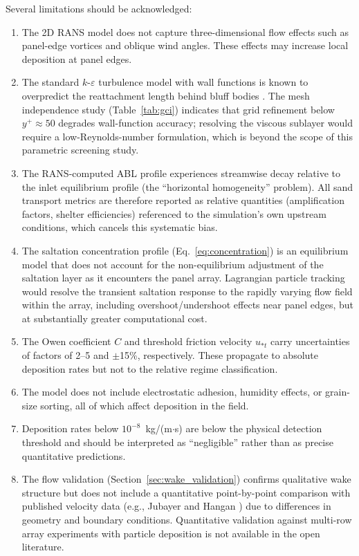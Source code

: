 \documentclass[preprint,12pt,review]{elsarticle}
\begin{document}
Several limitations should be acknowledged:
\begin{enumerate}
  \item The 2D RANS model does not capture three-dimensional flow effects such as panel-edge vortices and oblique wind angles. These effects may increase local deposition at panel edges.
  \item The standard $k$-$\varepsilon$ turbulence model with wall functions is known to overpredict the reattachment length behind bluff bodies \cite{tominaga2008wind}. The mesh independence study (Table~\ref{tab:gci}) indicates that grid refinement below $y^+ \approx 50$ degrades wall-function accuracy; resolving the viscous sublayer would require a low-Reynolds-number formulation, which is beyond the scope of this parametric screening study.
  \item The RANS-computed ABL profile experiences streamwise decay relative to the inlet equilibrium profile (the ``horizontal homogeneity'' problem). All sand transport metrics are therefore reported as relative quantities (amplification factors, shelter efficiencies) referenced to the simulation's own upstream conditions, which cancels this systematic bias.
  \item The saltation concentration profile (Eq.~\ref{eq:concentration}) is an equilibrium model that does not account for the non-equilibrium adjustment of the saltation layer as it encounters the panel array. Lagrangian particle tracking would resolve the transient saltation response to the rapidly varying flow field within the array, including overshoot/undershoot effects near panel edges, but at substantially greater computational cost.
  \item The Owen coefficient $C$ and threshold friction velocity $u_{*t}$ carry uncertainties of factors of 2--5 and $\pm$15\%, respectively. These propagate to absolute deposition rates but not to the relative regime classification.
  \item The model does not include electrostatic adhesion, humidity effects, or grain-size sorting, all of which affect deposition in the field.
  \item Deposition rates below $10^{-8}$~kg/(m$\cdot$s) are below the physical detection threshold and should be interpreted as ``negligible'' rather than as precise quantitative predictions.
  \item The flow validation (Section~\ref{sec:wake_validation}) confirms qualitative wake structure but does not include a quantitative point-by-point comparison with published velocity data (e.g., Jubayer and Hangan \cite{jubayer2016numerical}) due to differences in geometry and boundary conditions. Quantitative validation against multi-row array experiments with particle deposition is not available in the open literature.
\end{enumerate}
\end{document}
